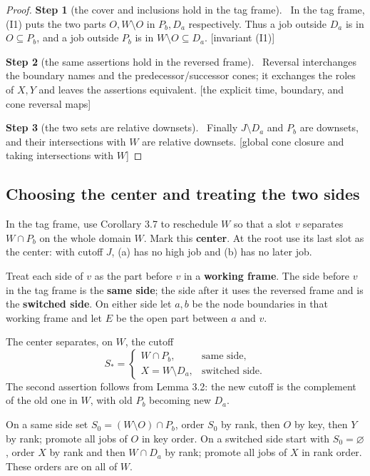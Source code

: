 \documentclass[11pt,a4paper]{article}
\theoremstyle{plain}
\theoremstyle{definition}
\newcommand{\step}[2]{\par\smallskip\noindent\textbf{Step #1} (#2).\ \ignorespaces}
\newcommand{\by}[1]{{\small[#1]}}
\begin{document}
\begin{proof}
\step{1}{the cover and inclusions hold in the tag frame}
In the tag frame, (I1) puts the two parts \(O,W\setminus O\) in \(P_b,D_a\) respectively. Thus a job outside \(D_a\) is in \(O\subseteq P_b\), and a job outside \(P_b\) is in \(W\setminus O\subseteq D_a\).
\by{invariant (I1)}

\step{2}{the same assertions hold in the reversed frame}
Reversal interchanges the boundary names and the predecessor/successor cones; it exchanges the roles of \(X,Y\) and leaves the assertions equivalent.
\by{the explicit time, boundary, and cone reversal maps}

\step{3}{the two sets are relative downsets}
Finally \(J\setminus D_a\) and \(P_b\) are downsets, and their intersections with \(W\) are relative downsets.
\by{global cone closure and taking intersections with $W$}
\end{proof}

\subsection{Choosing the center and treating the two sides}

In the tag frame, use Corollary 3.7 to reschedule \(W\) so that a slot \(v\) separates \(W\cap P_b\) on the whole domain \(W\). Mark this \textbf{center}. At the root use its last slot as the center: with cutoff \(J\), (a) has no high job and (b) has no later job.

Treat each side of \(v\) as the part before \(v\) in a \textbf{working frame}. The side before \(v\) in the tag frame is the \textbf{same side}; the side after it uses the reversed frame and is the \textbf{switched side}. On either side let \(a,b\) be the node boundaries in that working frame and let \(E\) be the open part between \(a\) and \(v\).

The center separates, on \(W\), the cutoff \[
S_*=
\begin{cases}
W\cap P_b,&\text{same side},\\
X=W\setminus D_a,&\text{switched side}.
\end{cases}
\tag{4.3}
\] The second assertion follows from Lemma 3.2: the new cutoff is the complement of the old one in \(W\), with old \(P_b\) becoming new \(D_a\).

On a same side set \(S_0=(W\setminus O)\cap P_b\), order \(S_0\) by rank, then \(O\) by key, then \(Y\) by rank; promote all jobs of \(O\) in key order. On a switched side start with \(S_0=\varnothing\), order \(X\) by rank and then \(W\cap D_a\) by rank; promote all jobs of \(X\) in rank order. These orders are on all of \(W\).
\end{document}
